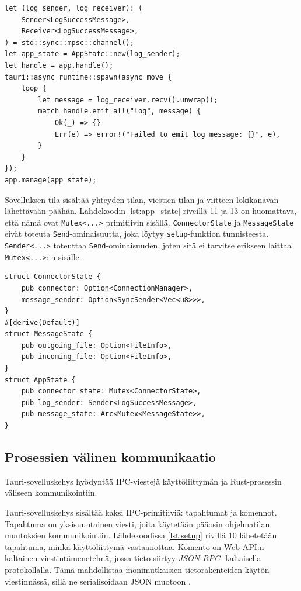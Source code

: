 \documentclass[a4paper,12pt]{article}
\begin{document}
    \begin{lstlisting}[caption={setup-sulkeuma}, label={lst:setup}]
let (log_sender, log_receiver): (
    Sender<LogSuccessMessage>,
    Receiver<LogSuccessMessage>,
) = std::sync::mpsc::channel();
let app_state = AppState::new(log_sender);
let handle = app.handle();
tauri::async_runtime::spawn(async move {
    loop {
        let message = log_receiver.recv().unwrap();
        match handle.emit_all("log", message) {
            Ok(_) => {}
            Err(e) => error!("Failed to emit log message: {}", e),
        }
    }
});
app.manage(app_state);\end{lstlisting}

    Sovelluksen tila sisältää yhteyden tilan, viestien tilan ja viitteen lokikanavan lähettävään päähän. Lähdekoodin \ref{lst:app_state} riveillä 11 ja 13 on huomattava, että nämä ovat \lstinline{Mutex<...>} primitiivin sisällä. \lstinline{ConnectorState} ja \lstinline{MessageState} eivät toteuta \lstinline{Send}-ominaisuutta, joka löytyy \lstinline{setup}-funktion tunnisteesta. \lstinline{Sender<...>} toteuttaa \lstinline{Send}-ominaisuuden, joten sitä ei tarvitse erikseen laittaa \lstinline{Mutex<...>}:in sisälle.

\newpage
    
    \begin{lstlisting}[caption={Sovelluksen tilan rakenne}, label={lst:app_state}]
struct ConnectorState {
    pub connector: Option<ConnectionManager>,
    message_sender: Option<SyncSender<Vec<u8>>>,
}
#[derive(Default)]
struct MessageState {
    pub outgoing_file: Option<FileInfo>,
    pub incoming_file: Option<FileInfo>,
}
struct AppState {
    pub connector_state: Mutex<ConnectorState>,
    pub log_sender: Sender<LogSuccessMessage>,
    pub message_state: Arc<Mutex<MessageState>>,
}\end{lstlisting}

    \subsection{Prosessien välinen kommunikaatio}
    Tauri-sovelluskehys hyödyntää IPC-viestejä käyttöliittymän ja Rust-prosessin väliseen kommunikointiin.

    Tauri-sovelluskehys sisältää kaksi IPC-primitiiviä: tapahtumat ja komennot.
    Tapahtuma on yksisuuntainen viesti, joita käytetään pääosin ohjelmatilan muutoksien kommunikointiin. Lähdekoodissa \ref{lst:setup} rivillä 10 lähetetään tapahtuma, minkä käyttöliittymä vastaanottaa. Komento on Web API:n kaltainen viestintämenetelmä, jossa tieto siirtyy \textit{JSON-RPC} -kaltaisella protokollalla. Tämä mahdollistaa monimutkaisien tietorakenteiden käytön viestinnässä, sillä ne serialisoidaan JSON muotoon \cite{tauri-app}.
\end{document}
